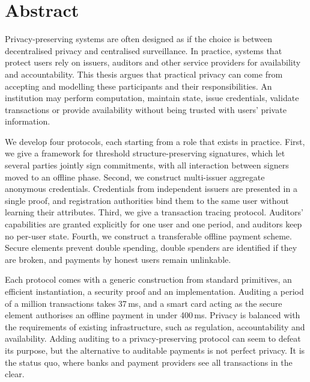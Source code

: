  \begingroup \let\clearpage\relax
\let\cleardoublepage\relax \let\cleardoublepage\relax

\chapter*{Abstract}

Privacy-preserving systems are often designed as if the choice is between
decentralised privacy and centralised surveillance. In practice, systems that
protect users rely on issuers, auditors and other service providers for 
availability and accountability. This thesis argues that practical privacy can come from
accepting and modelling these participants and their responsibilities. An institution may
perform computation, maintain state, issue credentials, validate transactions
or provide availability without being trusted with users' private information.

We develop four protocols, each starting from a role that exists in practice.
First, we give a framework for threshold structure-preserving signatures, which
let several parties jointly sign commitments, with all interaction between
signers moved to an offline phase. Second, we construct multi-issuer aggregate
anonymous credentials. Credentials from independent issuers are presented in a
single proof, and registration authorities bind them to the same user without
learning their attributes. Third, we give a transaction tracing protocol.
Auditors' capabilities are granted explicitly for one user and one period, and
auditors keep no per-user state. Fourth, we construct a transferable offline
payment scheme. Secure elements prevent double spending, double spenders are
identified if they are broken, and payments by honest users remain unlinkable.

Each protocol comes with a generic construction from standard primitives, an
efficient instantiation, a security proof and an implementation. Auditing a period
of a million transactions takes 37\,ms, and a smart card acting as the secure
element authorises an offline payment in under 400\,ms. Privacy is balanced
with the requirements of existing infrastructure, such as
regulation, accountability and availability. Adding auditing to a
privacy-preserving protocol can seem to defeat its purpose, but the alternative
to auditable payments is not perfect privacy. It is the status quo, where banks
and payment providers see all transactions in the clear.

